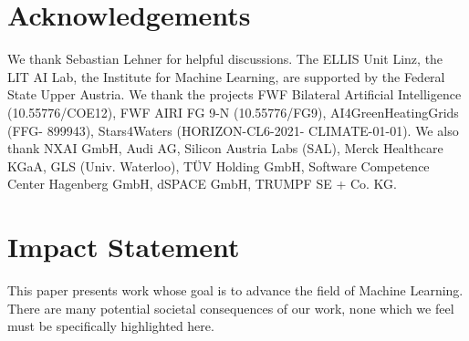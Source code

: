 \documentclass{article}
\theoremstyle{plain}
\theoremstyle{definition}
\theoremstyle{remark}
\begin{document}
\section*{Acknowledgements}
We thank Sebastian Lehner for helpful discussions.
The ELLIS Unit Linz, the LIT AI Lab, the Institute for Machine 
Learning, are supported by the Federal State Upper Austria. 
We thank the projects FWF Bilateral Artificial Intelligence (10.55776/COE12), FWF AIRI FG 9-N (10.55776/FG9), 
AI4GreenHeatingGrids (FFG- 899943), Stars4Waters (HORIZON-CL6-2021-
CLIMATE-01-01). We also thank NXAI GmbH, 
Audi AG, Silicon Austria Labs 
(SAL), Merck Healthcare KGaA, GLS (Univ. Waterloo), T\"{U}V 
Holding GmbH, Software Competence Center Hagenberg GmbH, dSPACE 
GmbH, TRUMPF SE + Co. KG.


\section*{Impact Statement}
This paper presents work whose goal is to advance the field of Machine
Learning. There are many potential societal consequences of our work, none
which we feel must be specifically highlighted here.






\appendix
\setcounter{figure}{0}
\setcounter{table}{0}
\renewcommand{\thefigure}{A\arabic{figure}}
\renewcommand{\thetable}{A\arabic{table}}
\onecolumn
\end{document}
